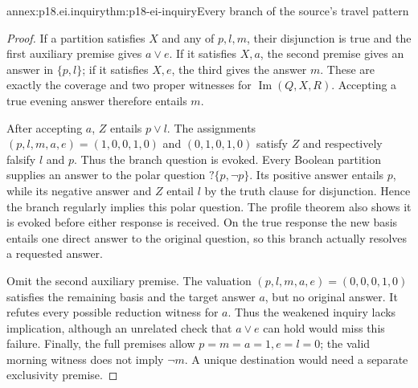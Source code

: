 \begin{annexitem}{annex:p18.ei.inquiry}{thm:p18-ei-inquiry}{Every branch of the source's travel pattern}
\begin{proof}
If a partition satisfies \(X\) and any of \(p,l,m\), their disjunction is
true and the first auxiliary premise gives \(a\lor e\). If it satisfies
\(X,a\), the second premise gives an answer in \(\{p,l\}\); if it
satisfies \(X,e\), the third gives the answer \(m\). These are exactly
the coverage and two proper witnesses for \(\operatorname{Im}(Q,X,R)\).
Accepting a true evening answer therefore entails \(m\).

After accepting \(a\), \(Z\) entails \(p\lor l\). The assignments
\((p,l,m,a,e)=(1,0,0,1,0)\) and \((0,1,0,1,0)\) satisfy \(Z\) and
respectively falsify \(l\) and \(p\). Thus the branch question is evoked.
Every Boolean partition supplies an answer to the polar question
\(?\{p,\neg p\}\). Its positive answer entails \(p\), while its negative
answer and \(Z\) entail \(l\) by the truth clause for disjunction. Hence
the branch regularly implies this polar question. The profile theorem also
shows it is evoked before either response is received. On the true response
the new basis entails one direct answer to the original question, so this
branch actually resolves a requested answer.

Omit the second auxiliary premise. The valuation
\((p,l,m,a,e)=(0,0,0,1,0)\) satisfies the remaining basis and the target
answer \(a\), but no original answer. It refutes every possible reduction
witness for \(a\). Thus the weakened inquiry lacks implication, although
an unrelated check that \(a\lor e\) can hold would miss this failure.
Finally, the full premises allow \(p=m=a=1,e=l=0\); the valid morning
witness does not imply \(\neg m\). A unique destination would need a
separate exclusivity premise.
\end{proof}
\end{annexitem}

